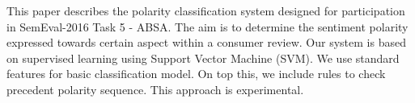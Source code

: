 This paper describes the polarity classification system designed for participation in SemEval-2016 Task 5 - ABSA. The aim is to determine the sentiment polarity expressed towards certain aspect within a consumer review. Our system is based on supervised learning using Support Vector Machine (SVM). We use standard features for basic classification model. On top this, we include rules to check precedent polarity sequence. This approach is experimental.
